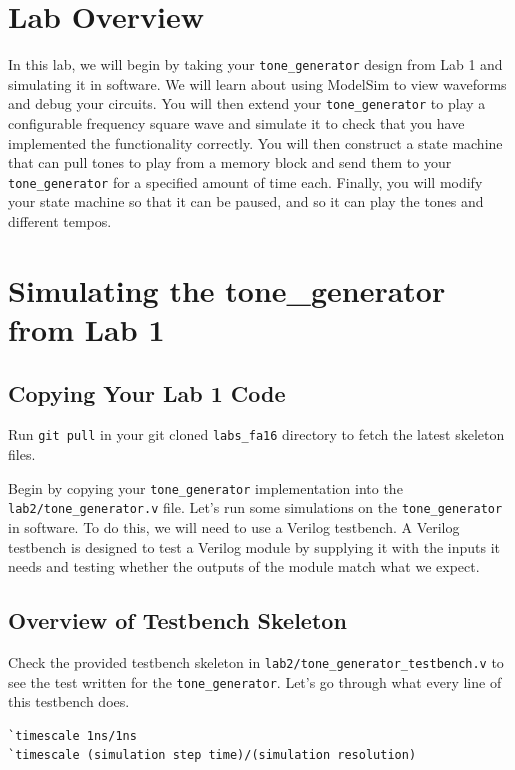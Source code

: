 \documentclass[11pt]{article}
\begin{document}
\section{Lab Overview}

In this lab, we will begin by taking your \verb|tone_generator| design from Lab 1 and simulating it in software. We will learn about using ModelSim to view waveforms and debug your circuits. You will then extend your \verb|tone_generator| to play a configurable frequency square wave and simulate it to check that you have implemented the functionality correctly. You will then construct a state machine that can pull tones to play from a memory block and send them to your \verb|tone_generator| for a specified amount of time each. Finally, you will modify your state machine so that it can be paused, and so it can play the tones and different tempos.

\section{Simulating the tone\_generator from Lab 1}

\subsection{Copying Your Lab 1 Code}

Run \verb|git pull| in your git cloned \verb|labs_fa16| directory to fetch the latest skeleton files.

Begin by copying your \verb|tone_generator| implementation into the \verb|lab2/tone_generator.v| file. Let's run some simulations on the \verb|tone_generator| in software. To do this, we will need to use a Verilog testbench. A Verilog testbench is designed to test a Verilog module by supplying it with the inputs it needs and testing whether the outputs of the module match what we expect.


\subsection{Overview of Testbench Skeleton}
Check the provided testbench skeleton in \verb|lab2/tone_generator_testbench.v| to see the test written for the \verb|tone_generator|. Let's go through what every line of this testbench does.

\begin{verbatim}
`timescale 1ns/1ns
`timescale (simulation step time)/(simulation resolution)
\end{verbatim}
\end{document}
